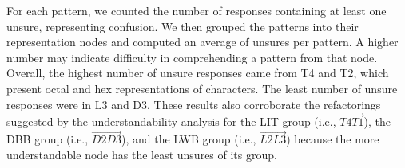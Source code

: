 For each pattern, we counted the number of responses containing at least one unsure, representing confusion.   
We then grouped the patterns into their representation nodes and computed an average of unsures per pattern.  
A higher number may indicate difficulty in comprehending a pattern from that node.  
Overall, the highest number of unsure responses came from T4 and T2, which present octal and hex representations of characters. The least number of unsure responses were in L3 and D3.
These results also corroborate the refactorings suggested by the understandability analysis for the LIT group (i.e., $\overrightarrow{T4 T1}$), the DBB group (i.e.,  $\overrightarrow{D2 D3}$), and the LWB group (i.e., $\overrightarrow{L2 L3}$) because the more understandable node has the least unsures of its group. 


